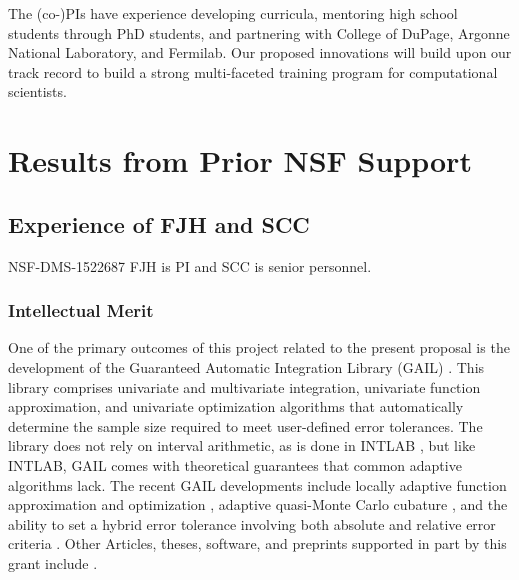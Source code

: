\documentclass[11pt]{NSFamsart}
\begin{document}
The (co-)PIs have experience developing curricula, mentoring high school students through PhD students, and partnering with College of DuPage, Argonne National Laboratory, and Fermilab.  Our proposed innovations will build upon our track record to build a strong multi-faceted training program for computational scientists.

\section{Results from Prior NSF Support} 
\subsection{Experience of FJH and SCC}
NSF-DMS-1522687 \label{SectFJHPrevious}  FJH is PI and SCC is senior personnel.  

\subsubsection{Intellectual Merit}
One of the primary outcomes of this project related to the present proposal is the development of the Guaranteed Automatic Integration Library (GAIL) \cite{ChoEtal17b}.  This library comprises univariate and multivariate integration, univariate function approximation, and univariate optimization algorithms that automatically determine the sample size required to meet user-defined error tolerances.  The library does not rely on interval arithmetic, as is done in INTLAB \cite{MoKeCl09, Rum99a, Rum10a}, but like INTLAB, GAIL comes with theoretical guarantees that common adaptive algorithms lack. The recent GAIL developments include locally adaptive function approximation and optimization \cite{ChoEtal17a, Din15a}, adaptive quasi-Monte Carlo cubature \cite{HicJim16a, JimHic16a}, and the ability to set a hybrid error tolerance involving both absolute and relative error criteria \cite{HicEtal17a}.  Other Articles, theses,  software, and preprints supported in part by this grant include 
\cite{ala_augmented_2017, 
	GilEtal16a,
	GilJim16b,
	HicEtal18a,	
	Hic17a,
	JohFasHic18a,
	Li16a,
	Liu17a,
	mccourt_stable_2017,
	mishra_hybrid_nodate,
	mishra_stable_nodate, 
	rashidinia_stable_nodate,
	vu_rbf-fd_nodate,
	Zha17a,
	Zho15a,
	ZhoHic15a}.
    
\end{document}
